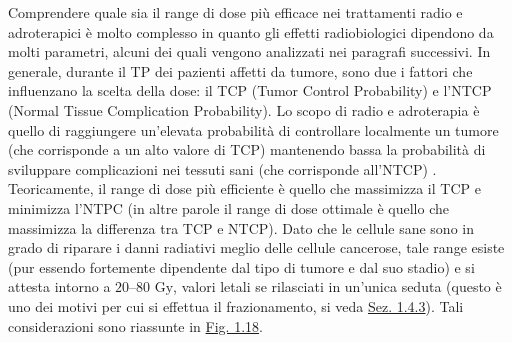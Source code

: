 \documentclass[12pt,a4paper,twoside]{report}
\begin{document}
	Comprendere quale sia il range di dose più efficace nei trattamenti radio e adroterapici è molto complesso in quanto gli effetti radiobiologici dipendono da molti parametri, alcuni dei quali vengono analizzati nei paragrafi successivi. In generale, durante il TP dei pazienti affetti da tumore, sono due i fattori che influenzano la scelta della dose: il TCP (Tumor Control Probability) e l'NTCP (Normal Tissue Complication Probability). Lo scopo di radio e adroterapia è quello di raggiungere un'elevata probabilità di controllare localmente un tumore (che corrisponde a un alto valore di TCP) mantenendo bassa la probabilità di sviluppare complicazioni nei tessuti sani (che corrisponde all'NTCP) \cite{Baumann2005-kp}. Teoricamente, il range di dose più efficiente è quello che massimizza il TCP e minimizza l'NTPC (in altre parole il range di dose ottimale è quello che massimizza la differenza tra TCP e NTCP). Dato che le cellule sane sono in grado di riparare i danni radiativi meglio delle cellule cancerose, tale range esiste (pur essendo fortemente dipendente dal tipo di tumore e dal suo stadio) e si attesta intorno a $20$--$80\mbox{ Gy}$, valori letali se rilasciati in un'unica seduta (questo è uno dei motivi per cui si effettua il frazionamento, si veda \hyperref[sec:sopravvivenza_cellulare]{Sez. 1.4.3}). Tali considerazioni sono riassunte in \hyperref[fig:tcp]{Fig. 1.18}.
\end{document}
